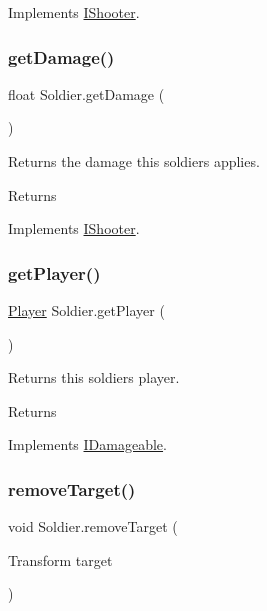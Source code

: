 Implements \mbox{\hyperlink{interface_i_shooter}{I\+Shooter}}.

\mbox{\label{class_soldier_afda3f1b1994521eb21aeede43f291838}} 
\subsubsection{\texorpdfstring{get\+Damage()}{getDamage()}}
{\footnotesize\ttfamily float Soldier.\+get\+Damage (\begin{DoxyParamCaption}{ }\end{DoxyParamCaption})}



Returns the damage this soldiers applies. 

\begin{DoxyReturn}{Returns}

\end{DoxyReturn}


Implements \mbox{\hyperlink{interface_i_shooter}{I\+Shooter}}.

\mbox{\label{class_soldier_a0295af34003267c45e4bbe1ce31fcdc2}} 
\subsubsection{\texorpdfstring{get\+Player()}{getPlayer()}}
{\footnotesize\ttfamily \mbox{\hyperlink{class_player}{Player}} Soldier.\+get\+Player (\begin{DoxyParamCaption}{ }\end{DoxyParamCaption})}



Returns this soldiers player. 

\begin{DoxyReturn}{Returns}

\end{DoxyReturn}


Implements \mbox{\hyperlink{interface_i_damageable}{I\+Damageable}}.

\mbox{\label{class_soldier_a2430cb561be4df43effa6e322a132316}} 
\subsubsection{\texorpdfstring{remove\+Target()}{removeTarget()}}
{\footnotesize\ttfamily void Soldier.\+remove\+Target (\begin{DoxyParamCaption}\item[{Transform}]{target }\end{DoxyParamCaption})}



